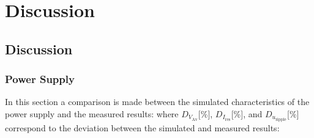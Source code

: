 \chapter{Discussion}
\label{chapter:discussion}
\section{Discussion}

\subsection{Power Supply}
\label{subsec:psdiscussion}
In this section a comparison is made between the simulated characteristics of the power supply and the measured results: where $D_{V_\text{Av}}$[\%], $D_{I_\text{res}}$[\%], and $D_{u_\text{ripple}}$[\%] correspond to the deviation between the simulated and measured results:
